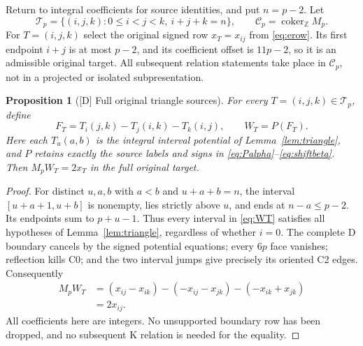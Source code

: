 \documentclass[11pt]{article}
\newtheorem{proposition}[theorem]{Proposition}
\theoremstyle{definition}
\theoremstyle{remark}
\newcommand{\Z}{\mathbb Z}
\newcommand{\coker}{\operatorname{coker}}
\begin{document}
Return to integral coefficients for source identities, and put $n=p-2$.
Let
\[
 \mathcal T_p=\{(i,j,k):0\leq i<j<k,\ i+j+k=n\},\qquad
 \mathcal C_p=\coker_{\Z}M_p.
\]
For $T=(i,j,k)$ select the original signed row $x_T=x_{ij}$ from
\eqref{eq:erow}. Its first endpoint $i+j$ is at most $p-2$, and its
coefficient offset is $11p-2$, so it is an admissible original target.
All subsequent relation statements take place in $\mathcal C_p$, not in
a projected or isolated subpresentation.

\begin{proposition}[{[D]} Full original triangle sources]\label{prop:all-triangle-sources}
For every $T=(i,j,k)\in\mathcal T_p$, define
\begin{equation}\label{eq:WT}
 F_T=T_i(j,k)-T_j(i,k)-T_k(i,j),\qquad W_T=P(F_T).
\end{equation}
Here each $T_u(a,b)$ is the integral interval potential of
Lemma~\ref{lem:triangle}, and $P$ retains exactly the source labels and
signs in \eqref{eq:Palpha}--\eqref{eq:shiftbeta}. Then
$M_pW_T=2x_T$ in the full original target.
\end{proposition}
\begin{proof}
For distinct $u,a,b$ with $a<b$ and $u+a+b=n$, the interval
$[u+a+1,u+b]$ is nonempty, lies strictly above $u$, and ends at
$n-a\leq p-2$. Its endpoints sum to $p+u-1$. Thus every interval
in \eqref{eq:WT} satisfies all hypotheses of Lemma~\ref{lem:triangle},
regardless of whether $i=0$. The complete D boundary cancels by the
signed potential equations; every $6p$ face vanishes; reflection kills
C0; and the two interval jumps give precisely its oriented C2 edges.
Consequently
\[
 \begin{split}
 M_pW_T
  &=(x_{ij}-x_{ik})-(-x_{ij}-x_{jk})-(-x_{ik}+x_{jk})\\
  &=2x_{ij}.
 \end{split}
\]
All coefficients here are integers. No unsupported boundary row has been
dropped, and no subsequent K relation is needed for the equality.
\end{proof}
\end{document}
